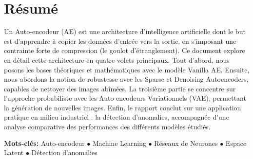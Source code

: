 \documentclass[11pt,a4paper]{report}
\begin{document}
\thispagestyle{empty}



\setcounter{page}{1}

 
\setcounter{page}{1}





\chapter*{Résumé}

Un Auto-encodeur (AE) est une architecture d'intelligence artificielle dont le but est d'apprendre à copier les données d'entrée vers la sortie, en s'imposant une contrainte forte de compression (le goulot d'étranglement). Ce document explore en détail cette architecture en quatre volets principaux. Tout d'abord, nous posons les bases théoriques et mathématiques avec le modèle Vanilla AE. Ensuite, nous abordons la notion de robustesse avec les Sparse et Denoising Autoencoders, capables de nettoyer des images abîmées. La troisième partie se concentre sur l'approche probabiliste avec les Auto-encodeurs Variationnels (VAE), permettant la génération de nouvelles images. Enfin, le rapport conclut sur une application pratique en milieu industriel : la détection d'anomalies, accompagnée d'une analyse comparative des performances des différents modèles étudiés.

\vspace{\fill}
\begin{flushleft}
{\Large \textbf{\textcolor{engineering}{Mots-clés}:}} 
Auto-encodeur \(\bullet\) 
Machine Learning \(\bullet\)
Réseaux de Neurones \(\bullet\)
Espace Latent \(\bullet\)
Détection d'anomalies
\end{flushleft}
\vspace*{24mm}

\acresetall 


\tableofcontents

\listoffigures
{}

\end{document}
